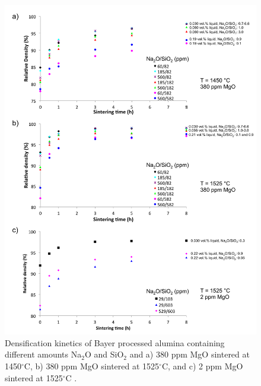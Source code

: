 \newpage
\begin{figure}[H]
	\centering
	\includegraphics[width=\textwidth]{Chapter-3/Figures/Figure3.png}
	\caption{Densification kinetics of Bayer processed alumina containing different amounts Na$_{2}$O and SiO$_{2}$ and a) 380 ppm MgO sintered at 1450$^{\circ}$C, b) 380 ppm MgO sintered at 1525$^{\circ}$C, and c) 2 ppm MgO sintered at 1525$^{\circ}$C \cite{Frueh2016a}.}
	\label{Ch3-figure:Figure3}
\end{figure}

